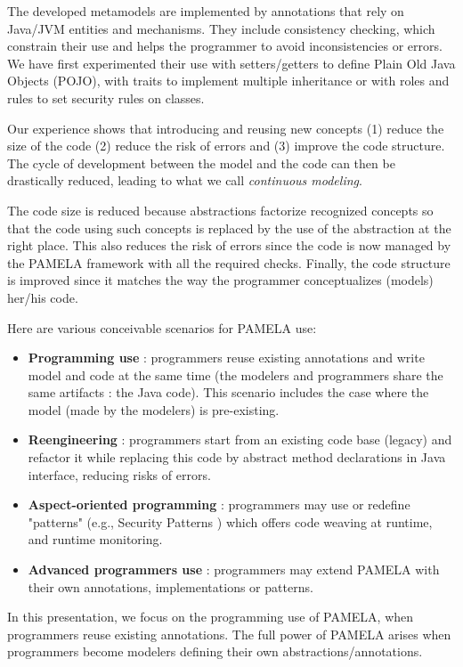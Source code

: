 
The developed metamodels are implemented by annotations that rely on Java/JVM entities and mechanisms. They include consistency checking, which constrain their use and helps the programmer to avoid inconsistencies or errors. We have first experimented their use with setters/getters to define Plain Old Java Objects (POJO), with traits to implement multiple inheritance or with roles and rules to set security rules on classes.

Our experience shows that introducing and reusing new concepts (1) reduce the size of the code (2) reduce the risk of errors and (3) improve the code structure. The cycle of development between the model and the code can then be drastically reduced, leading to what we call \emph{continuous modeling}.

The code size is reduced because abstractions factorize recognized concepts so that the code using such concepts is replaced by the use of the abstraction at the right place. This also reduces the risk of errors since the code is now managed by the PAMELA framework with all the required checks. Finally, the code structure is improved since it matches the way the programmer conceptualizes (models) her/his code.

Here are various conceivable scenarios for PAMELA use:
\begin{itemize}
    \vspace{-0.2cm}\item \textbf{Programming use} : programmers reuse existing annotations and write model and code at the same time (the modelers and programmers share the same artifacts : the Java code). This scenario includes the case where the model (made by the modelers) is pre-existing.
    \vspace{-0.2cm}\item \textbf{Reengineering} : programmers start from an existing code base (legacy) and refactor it while replacing this code by abstract method declarations in Java interface, reducing risks of errors.
    \vspace{-0.2cm}\item \textbf{Aspect-oriented programming} : programmers may use or redefine "patterns" (e.g., Security Patterns \cite{silva20}) which offers code weaving at runtime, and runtime monitoring.
    \vspace{-0.2cm}\item \textbf{Advanced programmers use} : programmers may extend PAMELA with their own annotations, implementations or patterns.
\end{itemize}

In this presentation, we focus on the programming use of PAMELA, when programmers reuse existing annotations. The full power of PAMELA arises when programmers become modelers defining their own abstractions/annotations.

